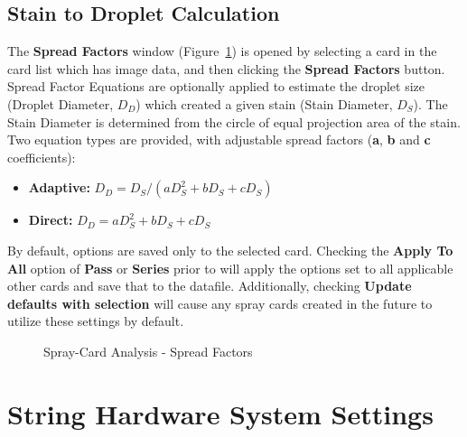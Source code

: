 \documentclass[10pt,letterpaper,titlepage]{article}
\begin{document}
    \subsection{Stain to Droplet Calculation}
    \label{sec:spread_factors}
    The \textbf{Spread Factors} window (Figure~\ref{fig:card_spread_factors}) is opened by selecting a card in the card list which has image data, and then clicking the \textbf{Spread Factors} button. Spread Factor Equations are optionally applied to estimate the droplet size (Droplet Diameter, $D_D$) which created a given stain (Stain Diameter, $D_S$). The Stain Diameter is determined from the circle of equal projection area of the stain. Two equation types are provided, with adjustable spread factors (\textbf{a}, \textbf{b} and \textbf{c} coefficients):
    \begin{itemize}
        \item \textbf{Adaptive:} $D_D = D_S / (aD_S^2+bD_S+cD_S)$
        \item \textbf{Direct:} $D_D = aD_S^2+bD_S+cD_S$
    \end{itemize}
    By default, options are saved only to the selected card. Checking the \textbf{Apply To All} option of \textbf{Pass} or \textbf{Series} prior to will apply the options set to all applicable other cards and save that to the datafile. Additionally, checking \textbf{Update defaults with selection} will cause any spray cards created in the future to utilize these settings by default.
    \begin{figure}[hb]
        \centering
        \caption{Spray-Card Analysis - Spread Factors}
        \label{fig:card_spread_factors}
    \end{figure}
    \FloatBarrier

    \newpage

    \section{String Hardware System Settings}
    \label{sec:string_hardware_settings}
\end{document}

